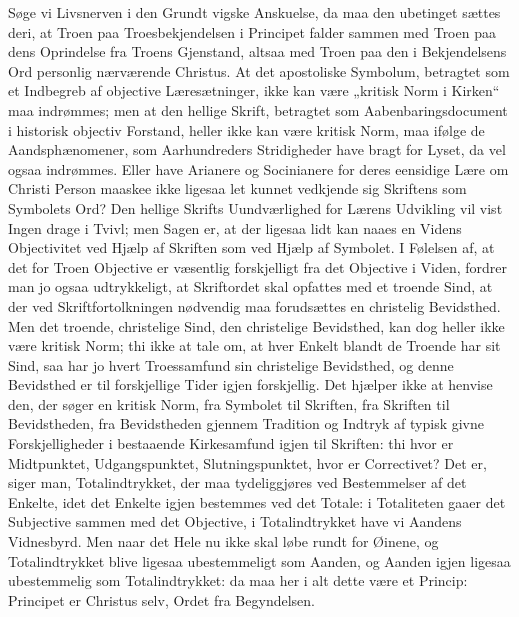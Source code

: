 \documentclass[12pt]{book}
\begin{document}
Søge vi Livsnerven i den Grundt\-
vigske Anskuelse, da maa den ubetinget sættes deri, at Troen paa
Troesbekjendelsen i Principet falder sammen med Troen paa dens
Oprindelse fra Troens Gjenstand, altsaa med Troen paa den i
Bekjendelsens Ord personlig nærværende Christus.
At det apostoliske Symbolum, betragtet som et Indbegreb af objective
Læresætninger, ikke kan være „kritisk Norm i Kirken“ maa indrømmes;
men at den hellige Skrift, betragtet som Aabenbaringsdocument i
historisk objectiv Forstand, heller ikke kan være kritisk Norm, maa
ifølge de Aandsphænomener, som Aarhundreders Stridigheder have
bragt for Lyset, da vel ogsaa indrømmes. Eller have Arianere og
Socinianere for deres eensidige Lære om Christi Person maaskee ikke
ligesaa let kunnet vedkjende sig Skriftens som Symbolets Ord? Den
hellige Skrifts Uundværlighed for Lærens Udvikling vil vist Ingen
drage i Tvivl; men Sagen er, at der ligesaa lidt kan naaes en Videns
Objectivitet ved Hjælp af Skriften som ved Hjælp af Symbolet. I
Følelsen af, at det for Troen Objective er væsentlig forskjelligt
fra det Objective i Viden, fordrer man jo ogsaa udtrykkeligt, at
Skriftordet skal opfattes med et troende Sind, at der ved
Skriftfortolkningen nødvendig maa forudsættes en christelig
Bevidsthed. Men det troende, christelige Sind, den christelige
Bevidsthed, kan dog heller ikke være kritisk Norm; thi ikke at tale
om, at hver Enkelt blandt de Troende har sit Sind, saa har jo hvert
Troessamfund sin christelige Bevidsthed, og denne Bevidsthed er til
forskjellige Tider igjen forskjellig. Det hjælper ikke at henvise
den, der søger en kritisk Norm, fra Symbolet til Skriften, fra
Skriften til Bevidstheden, fra Bevidstheden gjennem Tradition og
Indtryk af typisk givne Forskjelligheder i bestaaende Kirkesamfund
igjen til Skriften: thi hvor er Midtpunktet, Udgangspunktet,
Slutningspunktet, hvor er Correctivet? Det er, siger man,
Totalindtrykket, der maa
tydeliggjøres ved Bestemmelser af det Enkelte, idet det Enkelte
igjen bestemmes ved det Totale: i Totaliteten gaaer det Subjective
sammen med det Objective, i Totalindtrykket have vi Aandens
Vidnesbyrd. Men naar det Hele nu ikke skal løbe rundt for Øinene, og
Totalindtrykket blive ligesaa ubestemmeligt som Aanden, og Aanden
igjen ligesaa ubestemmelig som Totalindtrykket: da maa her i alt
dette være et Princip: Principet er Christus selv, Ordet fra
Begyndelsen.
\end{document}
